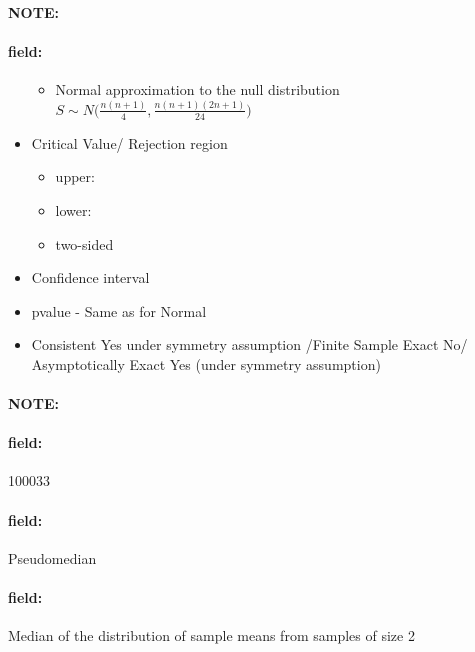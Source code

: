 \documentclass[12pt]{article}
\newenvironment{note}{\paragraph{NOTE:}}{}
\newenvironment{field}{\paragraph{field:}}{}
\begin{document}
\begin{note}
\begin{field}
\begin{itemize}
\begin{itemize}
          \item Normal approximation to the null distribution $S \sim N\big(\frac{n(n+1)}{4}, \frac{n(n+1)(2n+1)}{24}\big)$
         \end{itemize}
   \item Critical Value/ Rejection region
         \begin{itemize}
          \item upper:
          \item lower:
          \item two-sided
         \end{itemize}
   \item Confidence interval
   \item pvalue - Same as for Normal
   \item Consistent Yes under symmetry assumption /Finite Sample Exact No/ Asymptotically Exact Yes (under symmetry assumption)
  \end{itemize}
 \end{field}
\end{note}

\begin{note} \begin{field} \tiny 100033 \end{field}
 \begin{field}
  Pseudomedian
 \end{field}
 \begin{field}
  Median of the distribution of sample means from samples of size 2
 \end{field}
\end{note}
\end{document}
